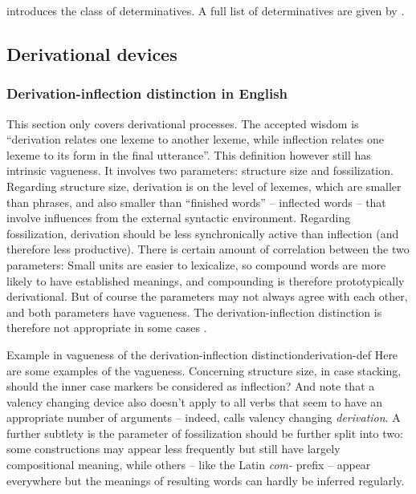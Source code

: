 \documentclass[UTF8, a4paper, oneside, scheme=plain]{ctexrep}
\newcommand*{\citepage}[1]{p.~{#1}}
\newcommand*{\term}[1]{\emph{#1}}
\newcommand{\corpus}[1]{\emph{#1}}
\begin{document}
\citet[\citepage{330}]{cgel} introduces the class of determinatives.
A full list of determinatives are given by \citet[\citepage{356}]{cgel}.

\subsection{Derivational devices}

\subsubsection{Derivation-inflection distinction in English}

This section only covers derivational processes.
The accepted wisdom is ``derivation relates one lexeme to another lexeme,
while inflection relates one lexeme to its form in the final utterance''.
This definition however still has intrinsic vagueness.
It involves two parameters:
structure size
and fossilization.
Regarding structure size,
derivation is on the level of lexemes,
which are smaller than phrases,
and also smaller than ``finished words'' -- inflected words -- 
that involve influences from the external syntactic environment.
Regarding fossilization, 
derivation should be less synchronically active than inflection
(and therefore less productive).
There is certain amount of correlation between the two parameters:
Small units are easier to lexicalize, 
so compound words are more likely to have established meanings,
and compounding is therefore prototypically derivational.
But of course the parameters may not always agree with each other,
and both parameters have vagueness.
The derivation-inflection distinction is therefore not appropriate 
in some cases \citep[\citepage{221}]{dixon2009basic1}.

\begin{infobox}{Example in vagueness of the derivation-inflection distinction}{derivation-def}
    Here are some examples of the vagueness.
    Concerning structure size, in case stacking, 
    should the inner case markers be considered as inflection?
    And note that a valency changing device also doesn't apply to all verbs that seem to have 
    an appropriate number of arguments --
    indeed, \citet{jacques2021grammar} calls valency changing \term{derivation}.
    A further subtlety is the parameter of fossilization should be further split into two:
    some constructions may appear less frequently but still have largely compositional meaning,
    while others -- like the Latin \corpus{com-} prefix -- 
    appear everywhere but the meanings of resulting words
    can hardly be inferred regularly.
\end{infobox}
\end{document}
